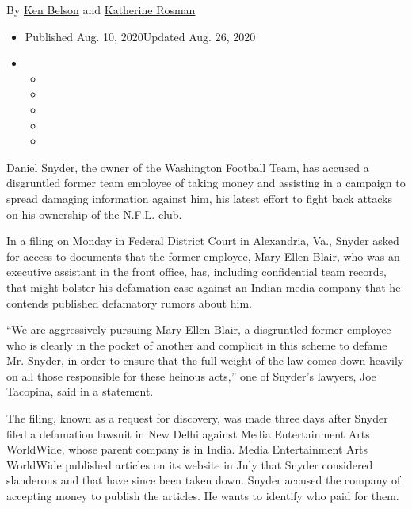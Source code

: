 By \href{https://www.nytimes3xbfgragh.onion/by/ken-belson}{Ken Belson}
and
\href{https://www.nytimes3xbfgragh.onion/by/katherine-rosman}{Katherine
Rosman}

\begin{itemize}
\item
  Published Aug. 10, 2020Updated Aug. 26, 2020
\item
  \begin{itemize}
  \item
  \item
  \item
  \item
  \item
  \end{itemize}
\end{itemize}

Daniel Snyder, the owner of the Washington Football Team, has accused a
disgruntled former team employee of taking money and assisting in a
campaign to spread damaging information against him, his latest effort
to fight back attacks on his ownership of the N.F.L. club.

In a filing on Monday in Federal District Court in Alexandria, Va.,
Snyder asked for access to documents that the former employee,
\href{http://prod.static.redskins.clubs.nfl.com/assets/docs/Washington-Redskins-Media-Guide.pdf}{Mary-Ellen
Blair}, who was an executive assistant in the front office, has,
including confidential team records, that might bolster his
\href{https://www.nytimes3xbfgragh.onion/2020/08/07/sports/dan-snyder-washington-nfl-defamation-lawsuit.html}{defamation
case against an Indian media company} that he contends published
defamatory rumors about him.

``We are aggressively pursuing Mary-Ellen Blair, a disgruntled former
employee who is clearly in the pocket of another and complicit in this
scheme to defame Mr. Snyder, in order to ensure that the full weight of
the law comes down heavily on all those responsible for these heinous
acts,'' one of Snyder's lawyers, Joe Tacopina, said in a statement.

The filing, known as a request for discovery, was made three days after
Snyder filed a defamation lawsuit in New Delhi against Media
Entertainment Arts WorldWide, whose parent company is in India. Media
Entertainment Arts WorldWide published articles on its website in July
that Snyder considered slanderous and that have since been taken down.
Snyder accused the company of accepting money to publish the articles.
He wants to identify who paid for them.

